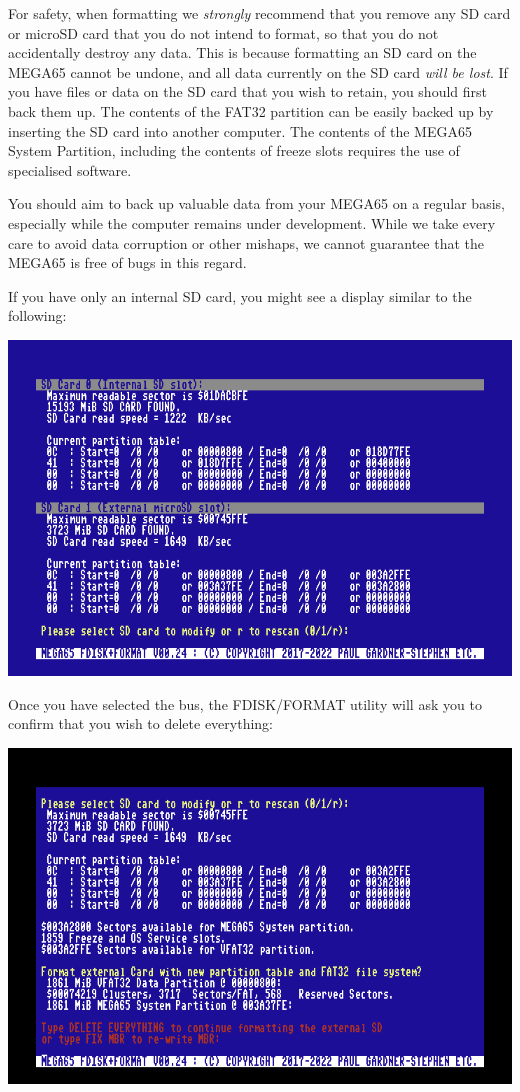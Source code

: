 For safety, when formatting we {\em strongly} recommend
that you remove any SD card or microSD card that you do not intend to
format, so that you do not accidentally destroy any data.  This is
because formatting an SD card on the MEGA65 cannot be undone, and
all data currently on the SD card {\em will be lost}.  If you
have files or data on the SD card that you wish to retain, you
should first back them up.  The contents of the FAT32
partition can be easily backed up by inserting the SD card into
another computer.  The contents of the MEGA65 System Partition,
including the contents of freeze slots requires the use of specialised
software.

You should aim to back up valuable data from your
MEGA65 on a regular basis, especially while the computer remains under
development.  While we take every care to avoid data corruption or
other mishaps, we cannot guarantee that the MEGA65 is free of bugs in
this regard.

If you have only an internal SD card, you might see a
display similar to the following:

\begin{center}
\includegraphics[trim= 10mm  7mm 10mm 10mm,clip,width=0.7\linewidth]{images/ss-m65fdisk-busselect.png}
\end{center}

Once you have selected the bus, the FDISK/FORMAT utility will ask you to confirm that you wish to delete everything:

\begin{center}
\includegraphics[trim= 10mm  7mm 10mm 15mm,clip,width=0.7\linewidth]{images/ss-m65fdisk-typesomething.png}
\end{center}

